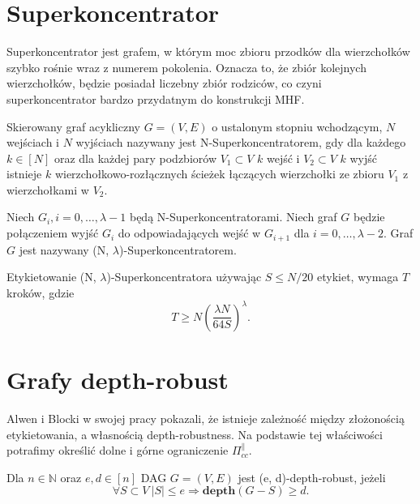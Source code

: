 \section{Superkoncentrator}
Superkoncentrator jest grafem, w którym moc zbioru przodków dla wierzchołków szybko rośnie wraz z numerem pokolenia. Oznacza to, że zbiór kolejnych wierzchołków, będzie posiadał liczebny zbiór rodziców, co czyni superkoncentrator bardzo przydatnym do konstrukcji MHF.
\begin{definition}[N-superkoncentrator] Skierowany graf acykliczny $G = (V, E)$ o ustalonym stopniu wchodzącym, $N$ wejściach i
	$N$ wyjściach nazywany jest N-Superkoncentratorem, gdy dla każdego $k \in [N]$
	oraz dla każdej pary podzbiorów $V_{1} \subset V$ $k$ wejść i $V_{2} \subset V$ $k$ wyjść istnieje
	$k$ wierzchołkowo-rozłącznych ścieżek łączących wierzchołki ze zbioru $V_{1}$ z wierzchołkami w $V_{2}$.
\end{definition}

\begin{definition} Niech $G_{i}, i = 0, \dots, \lambda-1$ będą N-Superkoncentratorami.
	Niech graf $G$ będzie połączeniem wyjść $G_{i}$ do odpowiadających wejść w $G_{i+1}$ dla $i = 0, \dots, \lambda - 2$.
	Graf $G$ jest nazywany (N, $\lambda$)-Superkoncentratorem.
\end{definition}

\begin{lemma} \cite[Lemat 1]{rs}
	Etykietowanie (N, $\lambda$)-Superkoncentratora używając $S \leq N/20$ etykiet, wymaga $T$ kroków, gdzie
	$$ T \geq N \left( \frac{ \lambda N}{64 S} \right) ^{ \lambda }.$$
\end{lemma}

\section{Grafy depth-robust}

Alwen i Blocki w swojej pracy \cite{depth}
pokazali, że istnieje zależność między złożonością etykietowania, a własnością depth-robustness. Na podstawie tej właściwości potrafimy określić dolne i górne ograniczenie $\Pi_{ cc }^{ \parallel }$.

\begin{definition} Dla $n \in \mathbb{N}$ oraz $e, d \in [n]$ DAG $G = (V, E)$
	jest (e, d)-depth-robust, jeżeli
	$$ \forall S \subset V \ | S | \leq e \Rightarrow \mathbf{depth}(G - S) \geq d.$$
\end{definition}

